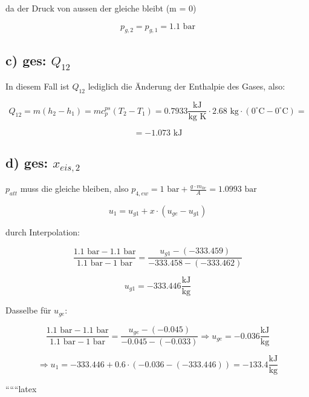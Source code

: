 da der Druck von aussen der gleiche bleibt (\Delta m = 0)

\[
p_{g,2} = p_{g,1} = 1.1 \text{ bar}
\]

\subsection*{c) ges: $Q_{12}$}

In diesem Fall ist $Q_{12}$ lediglich die Änderung der Enthalpie des Gases, also:

\[
Q_{12} = m(h_2 - h_1) = m c_p^{ps} (T_2 - T_1) = 0.7933 \frac{\text{kJ}}{\text{kg K}} \cdot 2.68 \text{ kg} \cdot (0^\circ \text{C} - 0^\circ \text{C}) = 
\]

\[
= -1.073 \text{ kJ}
\]

\subsection*{d) ges: $x_{eis,2}$}

$p_{att}$ muss die gleiche bleiben, also $p_{4,ew} = 1 \text{ bar} + \frac{g \cdot m_{kr}}{A} = 1.0993 \text{ bar}$

\[
u_1 = u_{g1} + x \cdot (u_{ge} - u_{g1})
\]

durch Interpolation:

\[
\frac{1.1 \text{ bar} - 1.1 \text{ bar}}{1.1 \text{ bar} - 1 \text{ bar}} = \frac{u_{g1} - (-333.459)}{-333.458 - (-333.462)}
\]

\[
u_{g1} = -333.446 \frac{\text{kJ}}{\text{kg}}
\]

Dasselbe für $u_{ge}$:

\[
\frac{1.1 \text{ bar} - 1.1 \text{ bar}}{1.1 \text{ bar} - 1 \text{ bar}} = \frac{u_{ge} - (-0.045)}{-0.045 - (-0.033)} \Rightarrow u_{ge} = -0.036 \frac{\text{kJ}}{\text{kg}}
\]

\[
\Rightarrow u_1 = -333.446 + 0.6 \cdot (-0.036 - (-333.446)) = -133.4 \frac{\text{kJ}}{\text{kg}}
\]

``````latex


